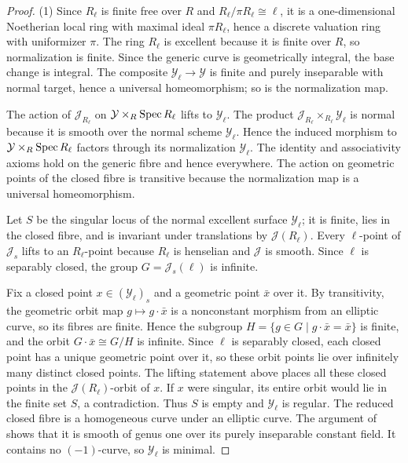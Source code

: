 \begin{proof}
(1) Since $R_{\ell}$ is finite free over $R$ and $R_{\ell}/\pi R_{\ell}\cong\ell$, it is a one-dimensional Noetherian local ring with maximal ideal $\pi R_{\ell}$, hence a discrete valuation ring with uniformizer $\pi$.
The ring $R_{\ell}$ is excellent because it is finite over $R$, so normalization is finite.
Since the generic curve is geometrically integral, the base change is integral.
The composite $\mathcal Y_{\ell}\to\mathcal Y$ is finite and purely inseparable with normal target, hence a universal homeomorphism; so is the normalization map.

The action of $\mathcal J_{R_{\ell}}$ on $\mathcal Y\times_R\operatorname{Spec} R_{\ell}$ lifts to $\mathcal Y_{\ell}$.
The product $\mathcal J_{R_{\ell}}\times_{R_{\ell}}\mathcal Y_{\ell}$ is normal because it is smooth over the normal scheme $\mathcal Y_{\ell}$.
Hence the induced morphism to $\mathcal Y\times_R\operatorname{Spec} R_{\ell}$ factors through its normalization $\mathcal Y_{\ell}$.
The identity and associativity axioms hold on the generic fibre and hence everywhere.
The action on geometric points of the closed fibre is transitive because the normalization map is a universal homeomorphism.

Let $S$ be the singular locus of the normal excellent surface $\mathcal Y_{\ell}$; it is finite, lies in the closed fibre, and is invariant under translations by $\mathcal J(R_{\ell})$.
Every $\ell$-point of $\mathcal J_s$ lifts to an $R_{\ell}$-point because $R_{\ell}$ is henselian and $\mathcal J$ is smooth.
Since $\ell$ is separably closed, the group $G=\mathcal J_s(\ell)$ is infinite.

Fix a closed point $x\in(\mathcal Y_{\ell})_s$ and a geometric point $\bar x$ over it.
By transitivity, the geometric orbit map $g\mapsto g\cdot\bar x$ is a nonconstant morphism from an elliptic curve, so its fibres are finite.
Hence the subgroup $H=\{g\in G\mid g\cdot\bar x=\bar x\}$ is finite, and the orbit $G\cdot\bar x\cong G/H$ is infinite.
Since $\ell$ is separably closed, each closed point has a unique geometric point over it, so these orbit points lie over infinitely many distinct closed points.
The lifting statement above places all these closed points in the $\mathcal J(R_{\ell})$-orbit of $x$.
If $x$ were singular, its entire orbit would lie in the finite set $S$, a contradiction.
Thus $S$ is empty and $\mathcal Y_{\ell}$ is regular.
The reduced closed fibre is a homogeneous curve under an elliptic curve.
The argument of \cite[Proposition~8.1]{LLR04} shows that it is smooth of genus one over its purely inseparable constant field.
It contains no $(-1)$-curve, so $\mathcal Y_{\ell}$ is minimal.


\end{proof}
